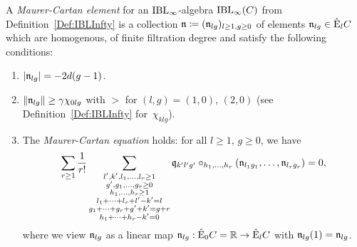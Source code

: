 \documentclass[\MainFolder/Text.tex]{subfiles}
\begin{document}
\begin{Def} \label{Def:MaurerCartan}
A \emph{Maurer-Cartan element} for an $\mathrm{IBL}_\infty$-algebra $\mathrm{IBL}_\infty(C)$ from Definition~\ref{Def:IBLInfty} is a collection $\mathfrak{n} \coloneqq (\mathfrak{n}_{lg})_{l\ge 1, g\ge 0}$ of elements $\mathfrak{n}_{lg}\in \hat{\mathrm{E}}_l C$ which are homogenous, of finite filtration degree and satisfy the following conditions:
\begin{enumerate}[label=\arabic*)]
\item $|\mathfrak{n}_{lg}| = - 2d(g-1)$.
\item $\| \mathfrak{n}_{lg} \|\ge\gamma \chi_{0lg}$ with $>$ for $(l,g)=(1,0)$, $(2,0)$ (see Definition~\ref{Def:IBLInfty} for~$\chi_{klg}$).
\item The \emph{Maurer-Cartan equation} holds: for all $l\ge 1$, $g\ge 0$, we have
\begin{equation} \label{Eq:MaurerCartanEquation}
\begin{aligned}
\sum_{r\ge 1}\frac{1}{r!}  \sum_{\substack{l', k', l_1, \dotsc, l_r\ge 1 \\ g', g_1, \dotsc, g_r \ge 0 \\ h_1, \dotsc, h_r \ge 1 \\ 
l_1 + \dotsb + l_r + l' - k'= l \\ g_1 + \dotsb + g_r + g' +  k' = g + r \\ h_1 + \dotsb + h_r - k' =0 } } \mathfrak{q}_{k' l' g'}\circ_{h_1,\dotsc,h_r} (\mathfrak{n}_{l_1 g_1},\dotsc,\mathfrak{n}_{l_r g_r}) = 0,
\end{aligned} 
\end{equation}
where we view $\mathfrak{n}_{lg}$ as a linear map $\mathfrak{n}_{lg}: \hat{\mathrm{E}}_0 C = \mathbb{R} \rightarrow \hat{\mathrm{E}}_l C$ with $\mathfrak{n}_{lg}(1) = \mathfrak{n}_{lg}$.

\end{enumerate}
\end{Def}

\end{document}
